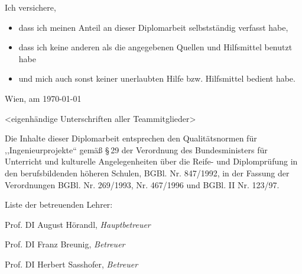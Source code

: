 \documentclass[a4paper,ngerman,naustrian,DIV=12,BCOR=1cm]{scrbook}
\begin{document}

\thispagestyle{fancy}





\thispagestyle{fancy}





\thispagestyle{fancy}

Ich versichere,
\begin{itemize}
\item dass ich meinen Anteil an dieser Diplomarbeit selbstständig verfasst
habe,
\item dass ich keine anderen als die angegebenen Quellen und Hilfsmittel
benutzt habe
\item und mich auch sonst keiner unerlaubten Hilfe bzw. Hilfsmittel bedient
habe.
\end{itemize}
\bigskip{}
Wien, am \today

<eigenhändige Unterschriften aller Teammitglieder>



\thispagestyle{fancy}

Die Inhalte dieser Diplomarbeit entsprechen den Qualitätsnormen für
,,Ingenieurprojekte`` gemäß §\,29 der Verordnung des Bundesministers
für Unterricht und kulturelle Angelegenheiten über die Reife- und
Diplomprüfung in den berufsbildenden höheren Schulen, BGBl. Nr. 847/1992,
in der Fassung der Verordnungen BGBl. Nr. 269/1993, Nr. 467/1996 und
BGBl. II Nr. 123/97.

\vspace{10mm}


Liste der betreuenden Lehrer:

Prof. DI August Hörandl, \textit{Hauptbetreuer}

Prof. DI Franz Breunig, \textit{Betreuer}

Prof. DI Herbert Sasshofer, \textit{Betreuer}

\vspace{10mm}

\renewcommand*{\chapterpagestyle}{fancy}
\cleardoublepage{}
\tableofcontents{}
\cleardoublepage{}
\listoftables
\cleardoublepage{}
\listoffigures
\end{document}
